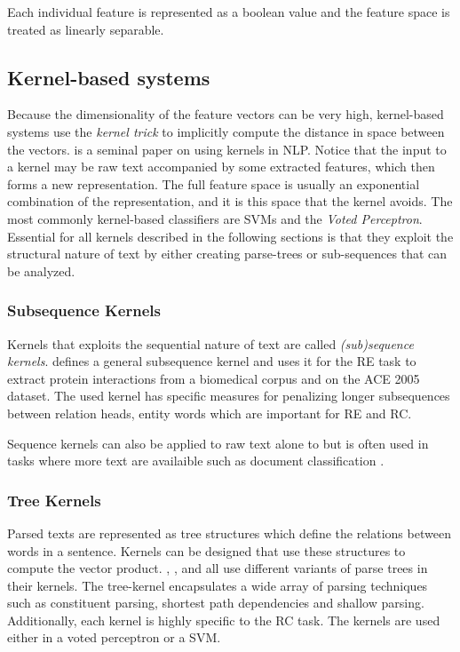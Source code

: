 Each individual feature is represented as a boolean value and the feature space is treated as linearly separable. 

\subsection{Kernel-based systems}

Because the dimensionality of the feature vectors can be very high, kernel-based systems use the \emph{kernel trick} to implicitly compute the distance in space between the vectors. \citep{collins2001} is a seminal paper on using kernels in NLP. Notice that the input to a kernel may be raw text accompanied by some extracted features, which then forms a new representation. The full feature space is usually an exponential combination of the representation, and it is this space that the kernel avoids. The most commonly kernel-based classifiers are SVMs and the \emph{Voted Perceptron}\citep{freund1999}.   
Essential for all kernels described in the following sections is that they exploit the structural nature of text by either creating parse-trees or sub-sequences that can be analyzed. 

\subsubsection{Subsequence Kernels}

Kernels that exploits the sequential nature of text are called \emph{(sub)sequence kernels}. \citep{subsequence_kernel} defines a general subsequence kernel and uses it for the RE task to extract protein interactions from a biomedical corpus and on the ACE 2005 dataset. The used kernel has specific measures for penalizing longer subsequences between relation heads, entity words which are important for RE and RC. 

Sequence kernels can also be applied to raw text alone to but is often used in tasks where more text are availaible such as document classification \citep{lodhi2002}.  

\subsubsection{Tree Kernels}

Parsed texts are represented as tree structures which define the relations between words in a sentence. Kernels can be designed that use these structures to compute the vector product. \citep{zelenko2003}, \citep{bunescu2005}, \citep{qian2008} and \citep{plank2013} all use different variants of parse trees in their kernels. The tree-kernel encapsulates a wide array of parsing techniques such as constituent parsing, shortest path dependencies and shallow parsing. Additionally, each kernel is highly specific to the RC task. The kernels are used either in a voted perceptron or a SVM.  


